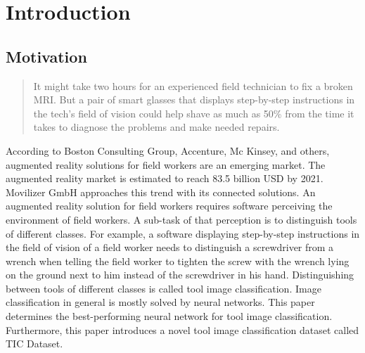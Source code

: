 \chapter{Introduction}

\section{Motivation}
\label{sec:motivation}
\blockquote[\cite{Detzel.2018}]{It might take two hours for an experienced field technician to fix a broken MRI. But a pair of smart glasses that displays step-by-step instructions in the tech’s field of vision could help shave as much as 50\% from the time it takes to diagnose the problems and make needed repairs.} According to Boston Consulting Group, Accenture, Mc Kinsey, and others, augmented reality solutions for field workers are an emerging market. \autocites{EY.2019a}{EY.2019b}{Detzel.2018}{Shook.2019}{Guy.2019} The augmented reality market is estimated to reach 83.5 billion USD by 2021. \autocite{Statista.2019} Movilizer GmbH approaches this trend with its connected solutions. \autocites{Honeywell.2018a}{Honeywell.2018b}
An augmented reality solution for field workers requires software perceiving the environment of field workers. A sub-task of that perception is to distinguish tools of different classes. For example, a software displaying step-by-step instructions in the field of vision of a field worker needs to distinguish a screwdriver from a wrench when telling the field worker to tighten the screw with the wrench lying on the ground next to him instead of the screwdriver in his hand.
Distinguishing between tools of different classes is called tool image classification. Image classification in general is mostly solved by neural networks. \autocites{ElAmir.2020}{LeCun.2015}{Singh.2020}{Michelucci.2019}{Gad.2018}{Kapur.2017} 
This paper determines the best-performing neural network for tool image classification. Furthermore, this paper introduces a novel tool image classification dataset called \ac{TIC Dataset}.



